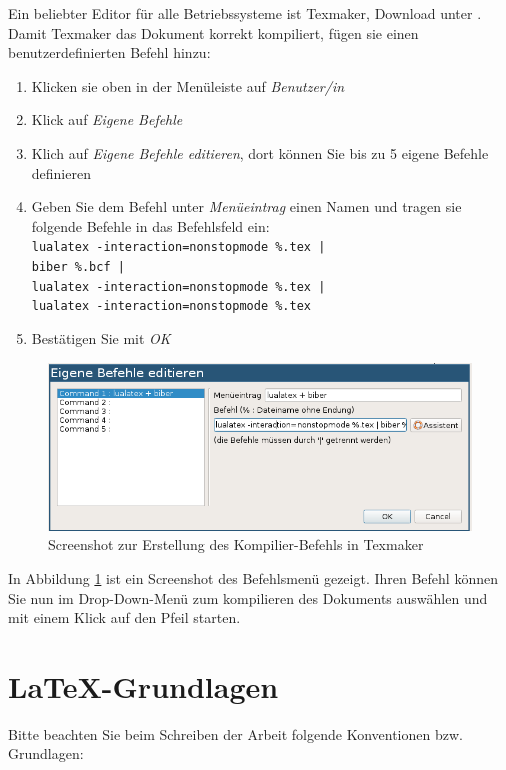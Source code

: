 Ein beliebter Editor für alle Betriebssysteme ist Texmaker, Download unter \cite{texmaker}.
Damit Texmaker das Dokument korrekt kompiliert, fügen sie einen benutzerdefinierten Befehl hinzu:
\begin{enumerate}
    \item Klicken sie oben in der Menüleiste auf \emph{Benutzer/in}
    \item Klick auf \emph{Eigene Befehle}
    \item Klich auf \emph{Eigene Befehle editieren}, dort können Sie bis zu 5 eigene Befehle definieren
    \item Geben Sie dem Befehl unter \emph{Menüeintrag} einen Namen und tragen sie folgende Befehle in das Befehlsfeld ein: \\
        \texttt{lualatex -interaction=nonstopmode \%.tex | \\
                biber \%.bcf | \\
                lualatex -interaction=nonstopmode \%.tex | \\
                lualatex -interaction=nonstopmode \%.tex}
    \item Bestätigen Sie mit \emph{OK}
\end{enumerate}

\begin{figure}[!h]
    \centering
    \includegraphics[width=12cm]{Plots/texmaker.png}
    \caption{Screenshot zur Erstellung des Kompilier-Befehls in Texmaker}
    \label{fig:texmaker}
\end{figure}


In Abbildung \ref{fig:texmaker} ist ein Screenshot des Befehlsmenü gezeigt. Ihren Befehl können Sie nun im Drop-Down-Menü zum 
kompilieren des Dokuments auswählen und mit einem Klick auf den Pfeil starten.


\chapter{\LaTeX-Grundlagen}

Bitte beachten Sie beim Schreiben der Arbeit folgende Konventionen bzw. Grundlagen:

